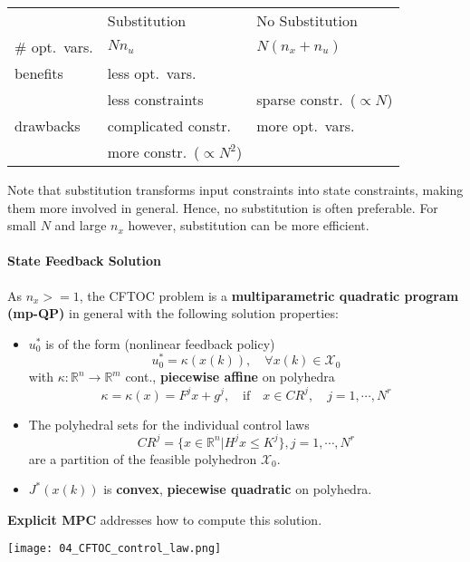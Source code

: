 \renewcommand{\arraystretch}{1.3}
\setlength{\oldtabcolsep}{\tabcolsep}\setlength\tabcolsep{6pt}
\begin{tabularx}{\linewidth}{@{}lll@{}}
                   & Substitution                  & No Substitution               \\
    \cmidrule{2-3}
    \# opt.\ vars. & $N n_u$                       & $N(n_x + n_u)$                \\
    benefits       & less opt.\ vars.              &                               \\
                   & less constraints              & sparse constr.\ ($\propto N$) \\
    drawbacks      & complicated constr.           & more opt.\ vars.              \\
                   & more constr.\ ($\propto N^2$) &                               %
\end{tabularx}
\renewcommand{\arraystretch}{1}
\setlength\tabcolsep{\oldtabcolsep}
Note that substitution transforms input constraints into state constraints, making them more involved in general. Hence, no substitution is often preferable. For small $N$ and large $n_x$ however, substitution can be more efficient.

\paragraph{State Feedback Solution}

As $n_x>=1$, the CFTOC problem is a \textbf{multiparametric quadratic program (mp-QP)} in general with the following solution properties:

\begin{itemize}
    \item $u_0^*$ is of the form (nonlinear feedback policy)
          \begin{equation*}
              u_0^*=\kappa(x(k)),\quad\forall x(k)\in\mathcal{X}_0
          \end{equation*}
          with $\kappa:\mathbb{R}^n \to \mathbb{R}^m$ cont., \textbf{piecewise affine} on polyhedra
          \begin{equation*}
              \kappa  =\kappa(x)=F^j x + g^j, \quad\mathrm{if}\quad x\in CR^j,\quad j=1,\cdots,N^r
          \end{equation*}
    \item The polyhedral sets for the individual control laws
          \begin{equation*}
              CR^j=\{x\in\mathbb{R}^n|H^j x\leq K^j\},j=1,\cdots,N^r
          \end{equation*}
          are a partition of the feasible polyhedron $\mathcal{X}_0$.
    \item $J^*(x(k))$ is \textbf{convex}, \textbf{piecewise quadratic} on polyhedra.
\end{itemize}
\newpar{}
\textbf{Explicit MPC} addresses how to compute this solution.
\begin{center}
    \texttt{[image: 04\_CFTOC\_control\_law.png]}
\end{center}

